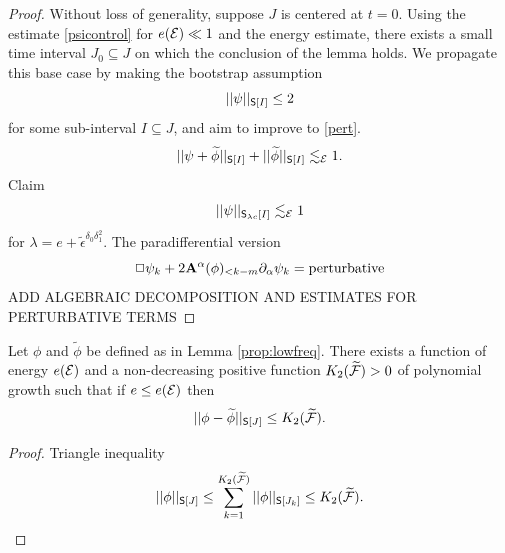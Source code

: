 \begin{proof}
	Without loss of generality, suppose $J$ is centered at $t = 0$. Using the estimate \eqref{psicontrol} for $e (\mathcal E) \ll 1$ and the energy estimate, there exists a small time interval $J_0 \subseteq J$ on which the conclusion of the lemma holds. We propagate this base case by making the bootstrap assumption
		\begin{equation}
			||\psi||_{\mathsf S[I]} \leq 2
		\label{eq:pertBA}
		\end{equation}
	for some sub-interval $I \subseteq J$, and aim to improve to \eqref{pert}. 
		\begin{equation}
			||\psi + \widetilde \phi||_{\mathsf S[I]} + ||\widetilde \phi||_{\mathsf S[I]} \lesssim_\mathcal E 1. 
		\end{equation}
	Claim 
		\begin{equation}
			||\psi||_{\mathsf S_{\lambda c} [I]} \lesssim_\mathcal E 1
		\end{equation}
	for $\lambda = e + \widetilde \epsilon^{\delta_0 \delta_1^2}$. The paradifferential version
		\begin{equation}
			\Box \psi_k + 2 {\bf A}^\alpha (\phi)_{< k - m} \partial_\alpha \psi_k = \text{perturbative}
		\end{equation}	
		{\color{red} ADD ALGEBRAIC DECOMPOSITION AND ESTIMATES FOR PERTURBATIVE TERMS}		
\end{proof}


\begin{proposition}
	Let $\phi$ and $\widetilde \phi$ be defined as in Lemma \ref{prop:lowfreq}. There exists a function of energy $e(\mathcal E)$ and a non-decreasing positive function $K_2 (\widetilde {\mathcal F}) > 0$ of polynomial growth such that if $e \leq e(\mathcal E)$ then
		\begin{equation}
			||\phi - \widetilde \phi||_{\mathsf S[J]} \leq K_2 (\widetilde {\mathcal F}). 
		\end{equation}
\end{proposition}

\begin{proof}
	Triangle inequality
		\[  
			||\phi||_{\mathsf S[J]} \leq \sum_{k = 1}^{K_2 (\widetilde {\mathcal F})} ||\phi||_{\mathsf S[J_k]} \leq K_2 (\widetilde {\mathcal F}). 
		\]
\end{proof}
